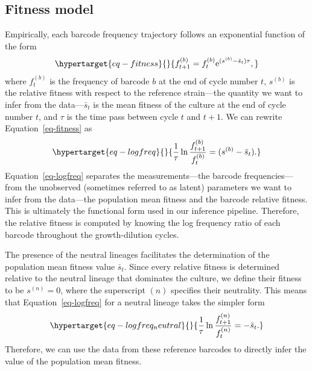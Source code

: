\documentclass[
]{scrartcl}
\begin{document}
\begin{refsegment}
\hypertarget{sec-fitness_model}{%
\subsection{Fitness model}\label{sec-fitness_model}}

Empirically, each barcode frequency trajectory follows an exponential
function of the form \autocite{levy2015,kinsler2020,ascensao2023}
\begin{equation}\protect\hypertarget{eq-fitness}{}{
f_{t+1}^{(b)} = f_{t}^{(b)} \mathrm{e}^{(s^{(b)} - \bar{s}_t)\tau},
}\label{eq-fitness}\end{equation} where \(f_{t}^{(b)}\) is the frequency
of barcode \(b\) at the end of cycle number \(t\), \(s^{(b)}\) is the
relative fitness with respect to the reference strain---the quantity we
want to infer from the data---\(\bar{s}_t\) is the mean fitness of the
culture at the end of cycle number \(t\), and \(\tau\) is the time pass
between cycle \(t\) and \(t+1\). We can rewrite
Equation~\ref{eq-fitness} as
\begin{equation}\protect\hypertarget{eq-logfreq}{}{
\frac{1}{\tau}\ln \frac{f_{t+1}^{(b)}}{f_{t}^{(b)}} = (s^{(b)} - \bar{s}_t).
}\label{eq-logfreq}\end{equation} Equation~\ref{eq-logfreq} separates
the measurements---the barcode frequencies---from the unobserved
(sometimes referred to as latent) parameters we want to infer from the
data---the population mean fitness and the barcode relative fitness.
This is ultimately the functional form used in our inference pipeline.
Therefore, the relative fitness is computed by knowing the log frequency
ratio of each barcode throughout the growth-dilution cycles.

The presence of the neutral lineages facilitates the determination of
the population mean fitness value \(\bar{s}_t\). Since every relative
fitness is determined relative to the neutral lineage that dominates the
culture, we define their fitness to be \(s^{(n)} = 0\), where the
superscript \((n)\) specifies their neutrality. This means that
Equation~\ref{eq-logfreq} for a neutral lineage takes the simpler form
\begin{equation}\protect\hypertarget{eq-logfreq_neutral}{}{
\frac{1}{\tau}\ln \frac{f_{t+1}^{(n)}}{f_{t}^{(n)}} = - \bar{s}_t.
}\label{eq-logfreq_neutral}\end{equation} Therefore, we can use the data
from these reference barcodes to directly infer the value of the
population mean fitness.


\end{refsegment}
\end{document}
